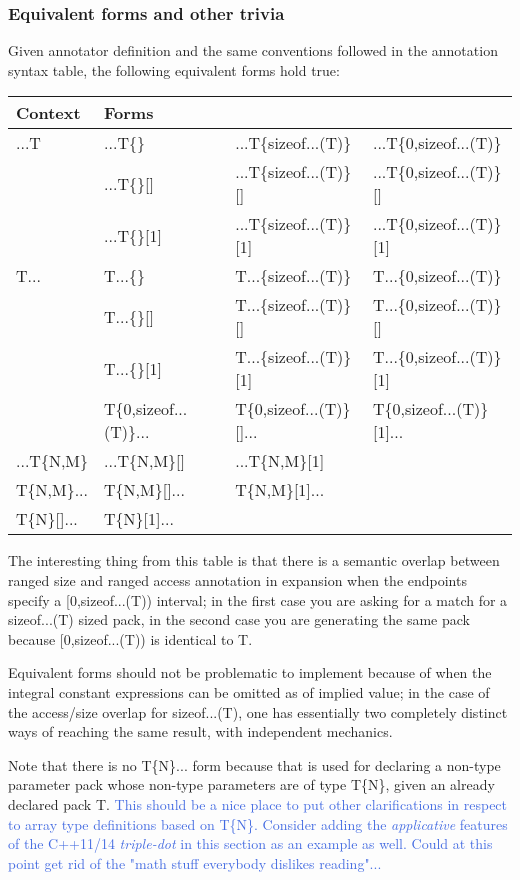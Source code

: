 \subsubsection{Equivalent forms and other trivia}
\p Given annotator definition and the same conventions followed in the annotation syntax table, the following equivalent forms hold true:

\begin{tabularx}{\textwidth}{l | l l l}
  \textbf{Context} & \textbf{Forms} \\
\hline
   ...T & ...T\{\}    & ...T\{sizeof...(T)\}     & ...T\{0,sizeof...(T)\} \\
        & ...T\{\}[]  & ...T\{sizeof...(T)\}[]   & ...T\{0,sizeof...(T)\}[] \\
        & ...T\{\}[1] & ...T\{sizeof...(T)\}[1] & ...T\{0,sizeof...(T)\}[1] \\

   T... & T...\{\} & T...\{sizeof...(T)\} & T...\{0,sizeof...(T)\} \\
        & T...\{\}[] & T...\{sizeof...(T)\}[] & T...\{0,sizeof...(T)\}[] \\
        & T...\{\}[1] & T...\{sizeof...(T)\}[1] & T...\{0,sizeof...(T)\}[1] \\
        & T\{0,sizeof...(T)\}... & T\{0,sizeof...(T)\}[]... & T\{0,sizeof...(T)\}[1]... \\
\hline
 ...T\{N,M\} & ...T\{N,M\}[] & ...T\{N,M\}[1] \\
\hline
   T\{N,M\}... & T\{N,M\}[]... & T\{N,M\}[1]... \\
\hline
   T\{N\}[]... & T\{N\}[1]... \\
\end{tabularx}

\p The interesting thing from this table is that there is a semantic overlap between ranged size and ranged access annotation in expansion when the endpoints specify a [0,sizeof...(T)) interval;
in the first case you are asking for a match for a sizeof...(T) sized pack, in the second case you are generating the same pack because [0,sizeof...(T)) is identical to T.

\p Equivalent forms should not be problematic to implement because of when the integral constant expressions can be omitted as of implied value; in the case of the access/size overlap for sizeof...(T), one has essentially two completely distinct ways of reaching the same result, with independent mechanics.

\p Note that there is no T\{N\}... form because that is used for declaring a non-type parameter pack whose non-type parameters are of type T\{N\}, given an already declared pack T.
\textcolor{RoyalBlue}{This should be a nice place to put other clarifications in respect to
array type definitions based on T\{N\}.
Consider adding the \textit{applicative} features of the C++11/14 \textit{triple-dot} in this section as an example as well.
Could at this point get rid of the "math stuff everybody dislikes reading"...}


